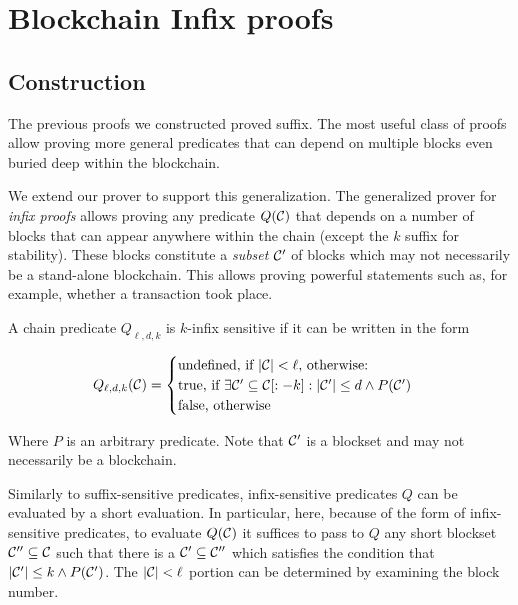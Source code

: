 \section{Blockchain Infix proofs}

\subsection{Construction}

The previous proofs we constructed proved suffix. The most useful class of
proofs allow proving more general predicates that can depend on multiple blocks
even buried deep within the blockchain.

We extend our prover to support this generalization. The generalized prover for
\textit{infix proofs} allows proving any predicate $Q(\mathcal{C})$ that depends on a
number of blocks that can appear anywhere within the chain (except the $k$
suffix for stability). These blocks constitute a \textit{subset} $\mathcal{C}'$ of
blocks which may not necessarily be a stand-alone blockchain. This allows
proving powerful statements such as, for example, whether a transaction took
place.

\begin{definition}
A chain predicate $Q_{\ell,d,k}$ is $k$-\textnormal{infix sensitive} if it can be
written in the form

$$
Q_{\ell,d,k}(\mathcal{C}) =
\begin{cases}
  \text{undefined, if } |\mathcal{C}| < \ell \text{, otherwise:}\\
  \text{true, if }
    \exists \mathcal{C}' \subseteq \mathcal{C}[:-k]: |\mathcal{C}'| \leq d \land P(\mathcal{C}')\\
  \text{false, otherwise}
\end{cases}
$$

Where $P$ is an arbitrary predicate. Note that $\mathcal{C}'$ is a blockset and may
not necessarily be a blockchain.
\end{definition}

Similarly to suffix-sensitive predicates, infix-sensitive predicates $Q$ can be
evaluated by a short evaluation. In particular, here, because of the form of
infix-sensitive predicates, to evaluate $Q(\mathcal{C})$ it suffices to pass to $Q$
any short blockset $\mathcal{C}'' \subseteq \mathcal{C}$ such that there is a $\mathcal{C}'
\subseteq \mathcal{C}''$ which satisfies the condition that $|\mathcal{C}'| \leq k \land
P(\mathcal{C}')$. The $|\mathcal{C}| < \ell$ portion can be determined by examining the
block number.

